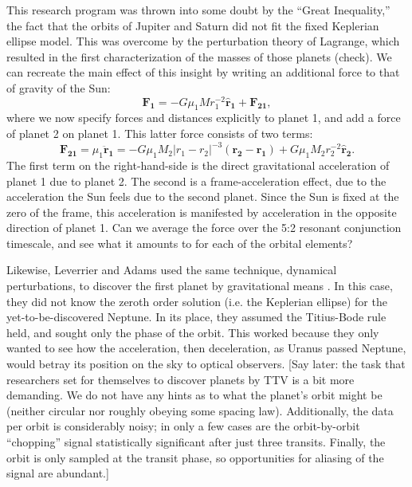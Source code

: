 \documentclass[graybox,natbib,nosecnum]{svmult}
\begin{document}
This research program was thrown into some doubt by the ``Great Inequality,'' the fact that the orbits of Jupiter and Saturn did not fit the fixed Keplerian ellipse model.  This was overcome by the perturbation theory of Lagrange, which resulted in the first characterization of the masses of those planets (check).  We can recreate the main effect of this insight by writing an additional force to that of gravity of the Sun: 
\begin{equation}
\mathbf{F_{1}} = -G \mu_1 M r_{1}^{-2} \mathbf{\hat r_{1}} + \mathbf{F_{21}},
\end{equation}
where we now specify forces and distances explicitly to planet 1, and add a force of planet 2 on planet 1.  This latter force consists of two terms: 
\begin{equation}
\mathbf{F_{21}} = \mu_1 \mathbf{\ddot r_1} = -G \mu_1 M_2 \vert r_{1}-r_{2}\vert^{-3} (\mathbf{r_{2}} - \mathbf{r_{1}}) + G \mu_1 M_2 r_{2}^{-2} \mathbf{\hat r_{2}}.
\end{equation}
The first term on the right-hand-side is the direct gravitational acceleration of planet 1 due to planet 2.  The second is a frame-acceleration effect, due to the acceleration the Sun feels due to the second planet.  Since the Sun is fixed at the zero of the frame, this acceleration is manifested by acceleration in the opposite direction of planet 1.  Can we average the force over the 5:2 resonant conjunction timescale, and see what it amounts to for each of the orbital elements? 

Likewise, Leverrier and Adams used the same technique, dynamical perturbations, to discover the first planet by gravitational means \citep{Adams1847,LeVerrier1877}. In this case, they did not know the zeroth order solution (i.e. the Keplerian ellipse) for the yet-to-be-discovered Neptune.  In its place, they assumed the Titius-Bode rule held, and sought only the phase of the orbit.  This worked because they only wanted to see how the acceleration, then deceleration, as Uranus passed Neptune, would betray its position on the sky to optical observers.  [Say later: the task that researchers set for themselves to discover planets by TTV is a bit more demanding.  We do not have any hints as to what the planet's orbit might be (neither circular nor roughly obeying some spacing law).  Additionally, the data per orbit is considerably noisy; in only a few cases are the orbit-by-orbit ``chopping'' signal statistically significant after just three transits. Finally, the orbit is only sampled at the transit phase, so opportunities for aliasing of the signal are abundant.]
\end{document}
